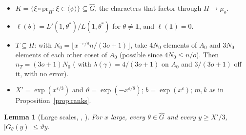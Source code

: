 \documentclass[11pt]{amsart}
\newcommand{\eps}{\varepsilon}
\newcommand{\Gh}{\widehat{G}}
\theoremstyle{plain}
\newtheorem{lemma}[theorem]{Lemma}
\theoremstyle{definition}
\numberwithin{equation}{section}
\begin{document}
\begin{itemize}
\item $K=\{\xi\circ\mathrm{pr}_H:\xi\in\langle\psi\rangle\}\subseteq\Gh$, the characters that factor
  through $H\to\mu_o$.
\item $\ell(\theta)=L'(1,\theta^\ast)/L(1,\theta^\ast)$ for $\theta\ne\mathbf1$, and $\ell(\mathbf1)=0$.
\item $T\subseteq H$: with $N_0=\lfloor x^{-\eps/8}n/(3o+1)\rfloor$, take $4N_0$ elements of $A_0$ and
  $3N_0$ elements of each other coset of $A_0$ (possible since $4N_0\le n/o$). Then
  $n_T=(3o+1)N_0$ ( with $\lambda(\gamma)=4/(3o+1)$ on $A_0$ and $3/(3o+1)$ off it, with
  no error).
\item $X'=\exp(x^{\eps/3})$ and $\vartheta=\exp(-x^{\eps/8})$; $b=\exp(x^\eps)$; $m,k$ as in
  Proposition~\ref{prop:ranks}.
\end{itemize}

\begin{lemma}[Large scales, , ]\label{lem:thin}
For $x$ large, every $\theta\in\Gh$ and every $y\ge X'/3$, $|G_\theta(y)|\le\vartheta y$.
\end{lemma}
\end{document}
